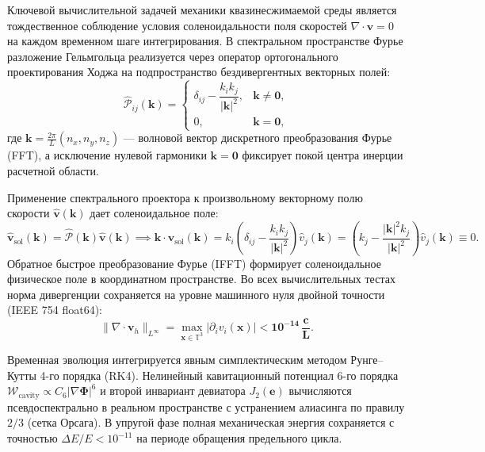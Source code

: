 \documentclass[11pt,a4paper]{article}
\theoremstyle{definition}
\theoremstyle{remark}
\begin{document}
Ключевой вычислительной задачей механики квазинесжимаемой среды является тождественное соблюдение условия соленоидальности поля скоростей $\nabla \cdot \mathbf{v} = 0$ на каждом временном шаге интегрирования. В спектральном пространстве Фурье разложение Гельмгольца реализуется через оператор ортогонального проектирования Ходжа на подпространство бездивергентных векторных полей:
\begin{equation}
    \widehat{\mathcal{P}}_{ij}(\mathbf{k}) = \begin{cases}
        \delta_{ij} - \dfrac{k_i k_j}{|\mathbf{k}|^2}, & \mathbf{k} \ne \mathbf{0}, \\[2mm]
        0, & \mathbf{k} = \mathbf{0},
    \end{cases}
    \label{eq:hodge_projector_discrete}
\end{equation}
где $\mathbf{k} = \frac{2\pi}{L}(n_x, n_y, n_z)$ --- волновой вектор дискретного преобразования Фурье (FFT), а исключение нулевой гармоники $\mathbf{k} = \mathbf{0}$ фиксирует покой центра инерции расчетной области.

Применение спектрального проектора к произвольному векторному полю скорости $\widehat{\mathbf{v}}(\mathbf{k})$ дает соленоидальное поле:
\begin{equation}
    \widehat{\mathbf{v}}_{\mathrm{sol}}(\mathbf{k}) = \widehat{\mathcal{P}}(\mathbf{k}) \widehat{\mathbf{v}}(\mathbf{k}) \implies \mathbf{k} \cdot \widehat{\mathbf{v}}_{\mathrm{sol}}(\mathbf{k}) = k_i \left( \delta_{ij} - \frac{k_i k_j}{|\mathbf{k}|^2} \right) \widehat{v}_j(\mathbf{k}) = \left( k_j - \frac{|\mathbf{k}|^2 k_j}{|\mathbf{k}|^2} \right) \widehat{v}_j(\mathbf{k}) \equiv 0.
\end{equation}
Обратное быстрое преобразование Фурье (IFFT) формирует соленоидальное физическое поле в координатном пространстве. Во всех вычислительных тестах норма дивергенции сохраняется на уровне машинного нуля двойной точности (IEEE 754 float64):
\begin{equation}
    \|\nabla \cdot \mathbf{v}_h\|_{L^\infty} = \max_{\mathbf{x} \in \mathbb{T}^3} |\partial_i v_i(\mathbf{x})| < \mathbf{10^{-14} \, \frac{c}{L}}.
    \label{eq:div_free_precision}
\end{equation}

Временная эволюция интегрируется явным симплектическим методом Рунге--Кутты 4-го порядка (RK4). Нелинейный кавитационный потенциал 6-го порядка $\mathcal{W}_{\mathrm{cavity}} \propto C_6 |\nabla \boldsymbol{\Phi}|^6$ и второй инвариант девиатора $J_2(\mathbf{e})$ вычисляются псевдоспектрально в реальном пространстве с устранением алиасинга по правилу $2/3$ (сетка Орсага). В упругой фазе полная механическая энергия сохраняется с точностью $\Delta E / E < 10^{-11}$ на периоде обращения предельного цикла.
\end{document}
